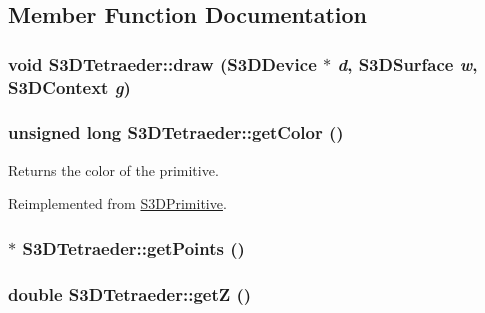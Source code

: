 \subsection{Member Function Documentation}
\hypertarget{class_s3_d_tetraeder_a35594d3c61c89fa1dbe7a6a115cea56b}{
\subsubsection[{draw}]{\setlength{\rightskip}{0pt plus 5cm}void S3DTetraeder::draw ({\bf S3DDevice} $\ast$ {\em d}, \/  {\bf S3DSurface} {\em w}, \/  {\bf S3DContext} {\em g})}}
\label{class_s3_d_tetraeder_a35594d3c61c89fa1dbe7a6a115cea56b}
\hypertarget{class_s3_d_tetraeder_ab79d98573d008f21c9a77f9d3633d6ae}{
\subsubsection[{getColor}]{\setlength{\rightskip}{0pt plus 5cm}unsigned long S3DTetraeder::getColor ()}}
\label{class_s3_d_tetraeder_ab79d98573d008f21c9a77f9d3633d6ae}


Returns the color of the primitive. 



Reimplemented from \hyperlink{class_s3_d_primitive_a4102845e7754e44c51a87c0fcb391c73}{S3DPrimitive}.

\hypertarget{class_s3_d_tetraeder_a2be4bd418fda569bf8bbfc0fbd70ef1b}{
\subsubsection[{getPoints}]{ $\ast$ S3DTetraeder::getPoints ()}}
\label{class_s3_d_tetraeder_a2be4bd418fda569bf8bbfc0fbd70ef1b}
\hypertarget{class_s3_d_tetraeder_a5f77481efa810aafb63e9d1d5c14ceea}{
\subsubsection[{getZ}]{\setlength{\rightskip}{0pt plus 5cm}double S3DTetraeder::getZ ()}}
\label{class_s3_d_tetraeder_a5f77481efa810aafb63e9d1d5c14ceea}


